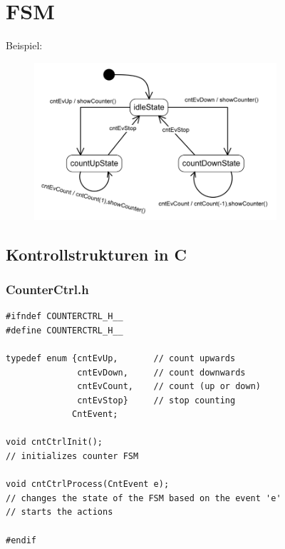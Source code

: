 \newpage
\section{FSM}

Beispiel:
\begin{figure}[htbp]
	\centering
	\includegraphics[width=9cm]{images/FSM.png}
\end{figure}

\subsection{Kontrollstrukturen in C }
\subsubsection{CounterCtrl.h}
\begin{lstlisting}[style=Csharp]
#ifndef COUNTERCTRL_H__
#define COUNTERCTRL_H__

typedef enum {cntEvUp,       // count upwards
              cntEvDown,     // count downwards
              cntEvCount,    // count (up or down)
              cntEvStop}     // stop counting
             CntEvent;

void cntCtrlInit();
// initializes counter FSM

void cntCtrlProcess(CntEvent e);
// changes the state of the FSM based on the event 'e'
// starts the actions

#endif
\end{lstlisting}

